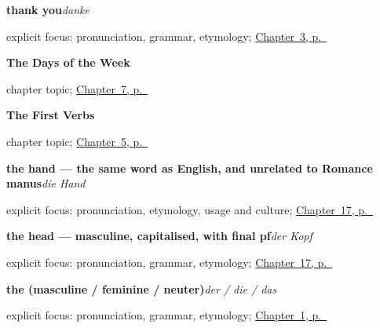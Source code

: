 \noindent\begin{minipage}[t]{\linewidth}
\raggedright
\textbf{thank you}\enspace\emph{danke}\par
\footnotesize explicit focus: pronunciation, grammar, etymology; \hyperref[ch:how-are-you]{Chapter~3, p.~\pageref*{ch:how-are-you}}
\end{minipage}\par\smallskip

\noindent\begin{minipage}[t]{\linewidth}
\raggedright
\textbf{The Days of the Week}\par
\footnotesize chapter topic; \hyperref[ch:days]{Chapter~7, p.~\pageref*{ch:days}}
\end{minipage}\par\smallskip

\noindent\begin{minipage}[t]{\linewidth}
\raggedright
\textbf{The First Verbs}\par
\footnotesize chapter topic; \hyperref[ch:first-verbs]{Chapter~5, p.~\pageref*{ch:first-verbs}}
\end{minipage}\par\smallskip

\noindent\begin{minipage}[t]{\linewidth}
\raggedright
\textbf{the hand — the same word as English, and unrelated to Romance manus}\enspace\emph{die Hand}\par
\footnotesize explicit focus: pronunciation, etymology, usage and culture; \hyperref[ch:ge-head-and-hand]{Chapter~17, p.~\pageref*{ch:ge-head-and-hand}}
\end{minipage}\par\smallskip

\noindent\begin{minipage}[t]{\linewidth}
\raggedright
\textbf{the head — masculine, capitalised, with final pf}\enspace\emph{der Kopf}\par
\footnotesize explicit focus: pronunciation, grammar, etymology; \hyperref[ch:ge-head-and-hand]{Chapter~17, p.~\pageref*{ch:ge-head-and-hand}}
\end{minipage}\par\smallskip

\noindent\begin{minipage}[t]{\linewidth}
\raggedright
\textbf{the (masculine / feminine / neuter)}\enspace\emph{der / die / das}\par
\footnotesize explicit focus: pronunciation, grammar, etymology; \hyperref[ch:greetings]{Chapter~1, p.~\pageref*{ch:greetings}}
\end{minipage}\par\smallskip

